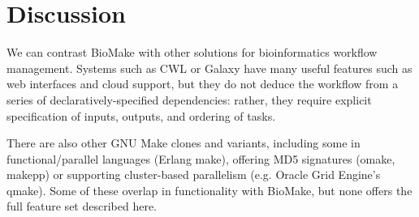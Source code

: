 % 
% 
% 

\section*{Discussion}

We can contrast BioMake with other solutions for bioinformatics workflow management.
Systems such as CWL or Galaxy have many useful features such as web interfaces and cloud support,
but they do not deduce the workflow from a series of declaratively-specified dependencies: rather, they require explicit specification of inputs, outputs, and ordering of tasks.

There are also other GNU Make clones and variants, including some in functional/parallel languages (Erlang make),
offering MD5 signatures (omake, makepp)
or supporting cluster-based parallelism (e.g. Oracle Grid Engine's qmake).
Some of these overlap in functionality with BioMake, but none offers the full feature set described here.


